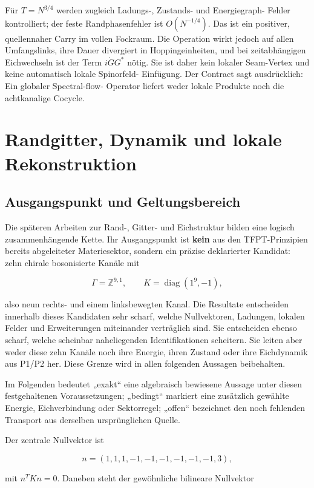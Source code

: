 \documentclass[11pt,a4paper,oneside,parskip=half,headings=normal,numbers=noenddot,bibliography=totoc]{scrreprt}
\begin{document}
Für \(T=N^{3/4}\) werden zugleich Ladungs-, Zustands- und Energiegraph-
Fehler kontrolliert; der feste Randphasenfehler ist $O(N^{-1/4})$. Das ist
ein positiver, quellennaher Carry im vollen Fockraum. Die Operation wirkt
jedoch auf allen Umfangslinks, ihre Dauer divergiert in Hoppingeinheiten,
und bei zeitabhängigen Eichwechseln ist der Term \(i\dot G G^*\) nötig. Sie
ist daher kein lokaler Seam-Vertex und keine automatisch lokale Spinorfeld-
Einfügung. Der Contract sagt ausdrücklich: Ein globaler Spectral-flow-
Operator liefert weder lokale Produkte noch die achtkanalige Cocycle.


\chapter{Randgitter, Dynamik und lokale Rekonstruktion}

\section{Ausgangspunkt und Geltungsbereich}

Die späteren Arbeiten zur Rand-, Gitter- und Eichstruktur bilden eine logisch zusammenhängende Kette. Ihr Ausgangspunkt ist \textbf{kein} aus den TFPT-Prinzipien bereits abgeleiteter Materiesektor, sondern ein präzise deklarierter Kandidat: zehn chirale bosonisierte Kanäle mit

\[
\Gamma=\mathbb Z^{9,1},\qquad K=\operatorname{diag}(1^9,-1),
\]

also neun rechts- und einem linksbewegten Kanal. Die Resultate entscheiden innerhalb dieses Kandidaten sehr scharf, welche Nullvektoren, Ladungen, lokalen Felder und Erweiterungen miteinander verträglich sind. Sie entscheiden ebenso scharf, welche scheinbar naheliegenden Identifikationen scheitern. Sie leiten aber weder diese zehn Kanäle noch ihre Energie, ihren Zustand oder ihre Eichdynamik aus P1/P2 her. Diese Grenze wird in allen folgenden Aussagen beibehalten.

Im Folgenden bedeutet „exakt“ eine algebraisch bewiesene Aussage unter diesen festgehaltenen Voraussetzungen; „bedingt“ markiert eine zusätzlich gewählte Energie, Eichverbindung oder Sektorregel; „offen“ bezeichnet den noch fehlenden Transport aus derselben ursprünglichen Quelle.

Der zentrale Nullvektor ist

\[
n=(1,1,1,-1,-1,-1,-1,-1,-1,3),
\]

mit \(n^TKn=0\). Daneben steht der gewöhnliche bilineare Nullvektor
\end{document}
